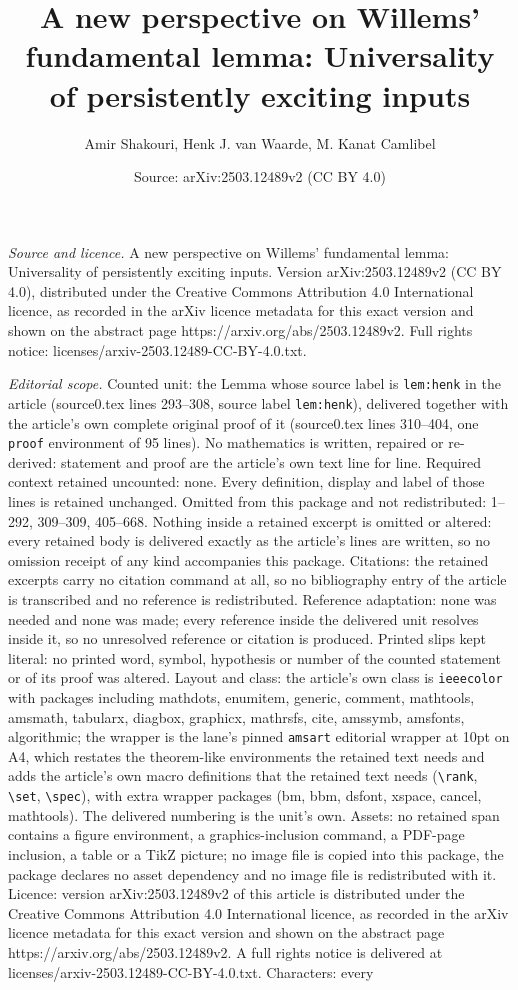 \documentclass[10pt,a4paper]{amsart}
\title[A new perspective on Willems' fundamental lemma: Universalit]{A new perspective on Willems' fundamental lemma: Universality of persistently exciting inputs}
\author{Amir Shakouri, Henk J. van Waarde, M. Kanat Camlibel}
\date{Source: arXiv:2503.12489v2 (CC BY 4.0)}
\begin{document}
\maketitle

\noindent\emph{Source and licence.} A new perspective on Willems' fundamental lemma: Universality of persistently exciting inputs. Version arXiv:2503.12489v2 (CC BY 4.0), distributed under the Creative Commons Attribution 4.0 International licence, as recorded in the arXiv licence metadata for this exact version and shown on the abstract page https://arxiv.org/abs/2503.12489v2. Full rights notice: licenses/arxiv-2503.12489-CC-BY-4.0.txt.\par\smallskip

\noindent\textit{Editorial scope.} Counted unit: the Lemma whose source label is \texttt{lem:henk} in the article (source0.tex lines 293--308, source label \texttt{lem:henk}), delivered together with the article's own complete original proof of it (source0.tex lines 310--404, one \texttt{proof} environment of 95 lines). No mathematics is written, repaired or re-derived: statement and proof are the article's own text line for line. Required context retained uncounted: none. Every definition, display and label of those lines is retained unchanged. Omitted from this package and not redistributed: 1--292, 309--309, 405--668. Nothing inside a retained excerpt is omitted or altered: every retained body is delivered exactly as the article's lines are written, so no omission receipt of any kind accompanies this package. Citations: the retained excerpts carry no citation command at all, so no bibliography entry of the article is transcribed and no reference is redistributed. Reference adaptation: none was needed and none was made; every reference inside the delivered unit resolves inside it, so no unresolved reference or citation is produced. Printed slips kept literal: no printed word, symbol, hypothesis or number of the counted statement or of its proof was altered. Layout and class: the article's own class is \texttt{ieeecolor} with packages including mathdots, enumitem, generic, comment, mathtools, amsmath, tabularx, diagbox, graphicx, mathrsfs, cite, amssymb, amsfonts, algorithmic; the wrapper is the lane's pinned \texttt{amsart} editorial wrapper at 10pt on A4, which restates the theorem-like environments the retained text needs and adds the article's own macro definitions that the retained text needs (\texttt{\textbackslash rank}, \texttt{\textbackslash set}, \texttt{\textbackslash spec}), with extra wrapper packages (bm, bbm, dsfont, xspace, cancel, mathtools). The delivered numbering is the unit's own. Assets: no retained span contains a figure environment, a graphics-inclusion command, a PDF-page inclusion, a table or a TikZ picture; no image file is copied into this package, the package declares no asset dependency and no image file is redistributed with it. Licence: version arXiv:2503.12489v2 of this article is distributed under the Creative Commons Attribution 4.0 International licence, as recorded in the arXiv licence metadata for this exact version and shown on the abstract page https://arxiv.org/abs/2503.12489v2. A full rights notice is delivered at licenses/arxiv-2503.12489-CC-BY-4.0.txt. Characters: every 
\end{document}
